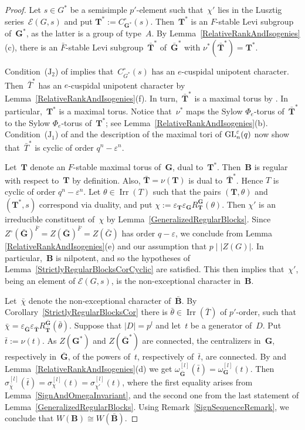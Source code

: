 \documentclass[12pt]{amsart}
\newcommand{\bG}{{\mathbf{G}}}      %
\newcommand{\bB}{{\mathbf{B}}}
\newcommand{\bT}{{\mathbf{T}}}
\def\GL{ \text{\rm GL} }
\DeclareMathOperator{\Irr}{Irr}
\theoremstyle{theorem}
\theoremstyle{definition}
\theoremstyle{remark}
\begin{document}
\begin{proof}
Let $s \in G^*$ be a semisimple $p'$-element such that~$\chi'$ lies in the 
Lusztig series~$\mathcal{E}( G, s )$ and put $\bT^* := C^{\circ}_{\bG^*}( s )$. 
Then~$\bT^*$ is an $F$-stable Levi subgroup of~$\bG^*$, as the latter is a group 
of type~$A$. By Lemma~\ref{RelativeRankAndIsogenies}(c), there is
an $\bar{F}$-stable Levi subgroup~$\bar{\bT}^*$ of~$\bar{\bG}^*$ with 
$\nu^*( \bar{\bT}^* ) = \bT^*$.  

Condition~($\text{J}_2$) of \cite[Subsection~$1.3$]{CaEn99} implies 
that~$C_{G^*}^{\circ}(s)$ has an $e$-cuspidal unipotent character. 
Then~$\bar{T}^*$ has an $e$-cuspidal unipotent character by
Lemma~\ref{RelativeRankAndIsogenies}(f). In turn,~$\bar{\bT}^*$ is a maximal 
torus by \cite[Proposition~$2.9$]{BrouMaMi}. In particular,~$\bT^*$ is a
maximal torus.
Notice that~$\nu^*$
maps the Sylow $\Phi_e$-torus of~$\bar{\bT}^*$ to the Sylow $\Phi_e$-torus
of~$\bT^*$; see Lemma~\ref{RelativeRankAndIsogenies}(b). 
Condition~($\text{J}_1$) of \cite[Subsection~$1.3$]{CaEn99} and the
description of the maximal tori of $\GL_n^\varepsilon(q)$ now show
that~$\bar{T}^*$ is cyclic of order $q^n - \varepsilon^n$.

Let~$\bT$ denote an $F$-stable maximal torus of~$\bG$, dual to~$\bT^*$.
Then~$\bB$ is regular with respect to~$\bT$ by definition. Also, $\bar{\bT}
= \nu( \bT )$ is dual to~$\bar{\bT}^*$. Hence $T$ is cyclic of order 
$q^n - {\varepsilon}^n$. 
Let $\theta \in \Irr(T)$ such that the pairs $(\bT, \theta )$ and $(\bT^*, s )$ 
correspond via duality, and put
$\chi := \varepsilon_{\bT}\varepsilon_{\bG}R_{\bT}^{\bG}( \theta )$. 
Then $\chi'$ is an irreducible constituent of~$\chi$ by
Lemma~\ref{GeneralizedRegularBlocks}. 
Since $Z^{\circ}( \bar{\bG} )^{\bar{F}} = 
Z( \bar{\bG} )^{\bar{F}} = Z( \bar{G} )$ has order $q - \varepsilon$,
we conclude from Lemma \ref{RelativeRankAndIsogenies}(e) and our assumption
that $p \mid |Z( G )|$.
In particular,~$\bB$ is nilpotent, and so the hypotheses of
Lemma~\ref{StrictlyRegularBlocksCorCyclic} are satisfied. This then implies 
that~$\chi'$, being an element of $\mathcal{E}( G, s )$, is the non-exceptional 
character in~$\bB$.

Let~$\bar{\chi}$ denote the non-exceptional character of~$\bar{\bB}$.
By Corollary~\ref{StrictlyRegularBlocksCor} there is $\bar{\theta} \in
\Irr( \bar{T} )$ of $p'$-order, such that 
$\bar{\chi} = \varepsilon_{\bar{\bG}}\varepsilon_{\bar{\bT}}
R_{\bar{\bT}}^{\bar{\bG}}( \bar{\theta} )$.
Suppose that $|D| = p^l$ and let~$t$ be a generator of~$D$. Put 
$\bar{t} := \nu(t)$. As $Z( \bG^* )$ and $Z( \bar{\bG}^* )$ are connected,
the centralizers in~$\bG$, respectively in~$\bar{\bG}$, of the powers of~$t$, 
respectively of~$\bar{t}$, are connected. By \cite[Theorem~$1.3.10$(e)]{GeMa} 
and Lemma~\ref{RelativeRankAndIsogenies}(d) we get 
$\omega_{\bar{\bG}}^{[l]}( \bar{t} ) = \omega_{\bG}^{[l]}( t )$.
Then $\sigma_{\bar{\chi}}^{[l]}( \bar{t} ) = \sigma_{\chi}^{[l]}( t )
= \sigma_{\chi'}^{[l]}( t )$, where the first equality arises from
Lemma~\ref{SignAndOmegaInvariant}, and the second one from the last
statement of Lemma~\ref{GeneralizedRegularBlocks}. 
Using Remark~\ref{SignSequenceRemark}, we conclude that
$W( \bB ) \cong W( \bar{\bB} )$.
\end{proof}
\end{document}
